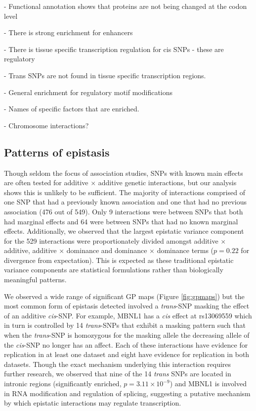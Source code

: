 \documentclass{article}
\begin{document}
- Functional annotation shows that proteins are not being changed at the codon level

- There is strong enrichment for enhancers

- There is tissue specific transcription regulation for cis SNPs - these are regulatory

- Trans SNPs are not found in tissue specific transcription regions.

- General enrichment for regulatory motif modifications

- Names of specific factors that are enriched.

- Chromosome interactions?


\subsection{Patterns of epistasis}
Though seldom the focus of association studies, SNPs with known main effects are often tested for additive $\times$ additive genetic interactions, but our analysis shows this is unlikely to be sufficient. The majority of interactions comprised of one SNP that had a previously known association and one that had no previous association (476 out of 549). Only 9 interactions were between SNPs that both had marginal effects and 64 were between SNPs that had no known marginal effects. Additionally, we observed that the largest epistatic variance component for the 529 interactions were proportionately divided amongst additive $\times$ additive, additive $\times$ dominance and dominance $\times$ dominance terms ($p = 0.22$ for divergence from expectation). This is expected as these traditional epistatic variance components are statistical formulations rather than biologically meaningful patterns.

We observed a wide range of significant GP maps (Figure \ref{fig:gpmaps}) but the most common form of epistasis detected involved a \emph{trans}-SNP masking the effect of an additive \emph{cis}-SNP. For example, MBNL1 has a \emph{cis} effect at rs13069559 which in turn is controlled by 14 \emph{trans}-SNPs that exhibit a masking pattern such that when the \emph{trans}-SNP is homozygous for the masking allele the decreasing allele of the \emph{cis}-SNP no longer has an affect. Each of these interactions have evidence for replication in at least one dataset and eight have evidence for replication in both datasets. Though the exact mechanism underlying this interaction requires further research, we observed that nine of the 14 \emph{trans} SNPs are located in intronic regions (significantly enriched, $p = 3.11 \times 10^{-9}$) and MBNL1 is involved in RNA modification and regulation of splicing, suggesting a putative mechanism by which epistatic interactions may regulate transcription.
\end{document}
